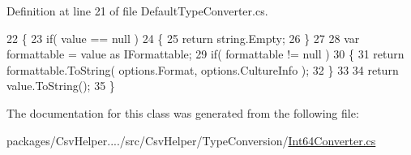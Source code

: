 Definition at line 21 of file Default\-Type\-Converter.\-cs.


\begin{DoxyCode}
22         \{
23             \textcolor{keywordflow}{if}( value == null )
24             \{
25                 \textcolor{keywordflow}{return} string.Empty;
26             \}
27 
28             var formattable = value as IFormattable;
29             \textcolor{keywordflow}{if}( formattable != null )
30             \{
31                 \textcolor{keywordflow}{return} formattable.ToString( options.Format, options.CultureInfo );
32             \}
33 
34             \textcolor{keywordflow}{return} value.ToString();
35         \}
\end{DoxyCode}


The documentation for this class was generated from the following file\-:\begin{DoxyCompactItemize}
\item 
packages/\-Csv\-Helper..../src/\-Csv\-Helper/\-Type\-Conversion/\hyperlink{a00251}{Int64\-Converter.\-cs}\end{DoxyCompactItemize}
